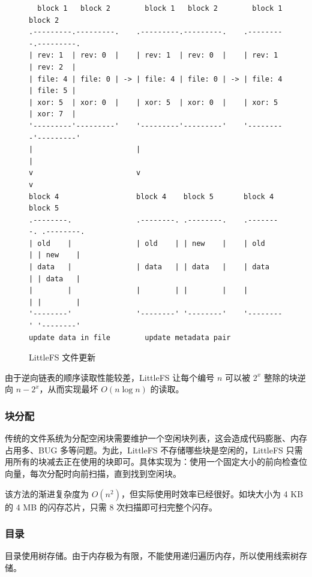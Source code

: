 \documentclass{ctexart}
\begin{document}
\begin{figure}
\begin{verbatim}
  block 1   block 2        block 1   block 2        block 1   block 2
.---------.---------.    .---------.---------.    .---------.---------.
| rev: 1  | rev: 0  |    | rev: 1  | rev: 0  |    | rev: 1  | rev: 2  |
| file: 4 | file: 0 | -> | file: 4 | file: 0 | -> | file: 4 | file: 5 |
| xor: 5  | xor: 0  |    | xor: 5  | xor: 0  |    | xor: 5  | xor: 7  |
'---------'---------'    '---------'---------'    '---------'---------'
|                        |                                  |
v                        v                                  v
block 4                  block 4    block 5       block 4    block 5
.--------.               .--------. .--------.    .--------. .--------.
| old    |               | old    | | new    |    | old    | | new    |
| data   |               | data   | | data   |    | data   | | data   |
|        |               |        | |        |    |        | |        |
'--------'               '--------' '--------'    '--------' '--------'
update data in file        update metadata pair
\end{verbatim}
\caption{LittleFS 文件更新}
\end{figure}

由于逆向链表的顺序读取性能较差，LittleFS 让每个编号 $n$ 可以被 $2^x$ 整除的块逆向 $n-2^x$，从而实现最坏 $O(n \log n)$ 的读取。

\subsubsection{块分配}

传统的文件系统为分配空闲块需要维护一个空闲块列表，这会造成代码膨胀、内存占用多、BUG 多等问题。为此，LittleFS 不存储哪些块是空闲的，LittleFS 只需用所有的块减去正在使用的块即可。具体实现为：使用一个固定大小的前向检查位向量，每次分配时向前扫描，直到找到空闲块。

该方法的渐进复杂度为 $O(n^2)$，但实际使用时效率已经很好。如块大小为 4 KB 的 4 MB 的闪存芯片，只需 8 次扫描即可扫完整个闪存。

\subsubsection{目录}

目录使用树存储。由于内存极为有限，不能使用递归遍历内存，所以使用线索树存储。
\end{document}
